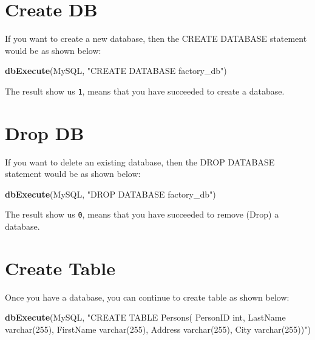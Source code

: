 \documentclass[
]{book}
\newenvironment{Shaded}{\begin{snugshade}}{\end{snugshade}}
\newcommand{\FunctionTok}[1]{\textcolor[rgb]{0.13,0.29,0.53}{\textbf{#1}}}
\newcommand{\NormalTok}[1]{#1}
\newcommand{\StringTok}[1]{\textcolor[rgb]{0.31,0.60,0.02}{#1}}
\begin{document}
\hypertarget{create-db}{%
\section{Create DB}\label{create-db}}

If you want to create a new database, then the CREATE DATABASE statement would be as shown below:

\begin{Shaded}
\begin{Highlighting}[]
\FunctionTok{dbExecute}\NormalTok{(MySQL, }\StringTok{"CREATE DATABASE factory\_db"}\NormalTok{)}
\end{Highlighting}
\end{Shaded}

The result show us \texttt{1}, means that you have succeeded to create a database.

\hypertarget{drop-db}{%
\section{Drop DB}\label{drop-db}}

If you want to delete an existing database, then the DROP DATABASE statement would be as shown below:

\begin{Shaded}
\begin{Highlighting}[]
\FunctionTok{dbExecute}\NormalTok{(MySQL, }\StringTok{"DROP DATABASE factory\_db"}\NormalTok{)}
\end{Highlighting}
\end{Shaded}

The result show us \texttt{0}, means that you have succeeded to remove (Drop) a database.

\hypertarget{create-table}{%
\section{Create Table}\label{create-table}}

Once you have a database, you can continue to create table as shown below:

\begin{Shaded}
\begin{Highlighting}[]
\FunctionTok{dbExecute}\NormalTok{(MySQL, }\StringTok{"CREATE TABLE Persons(}
\StringTok{                 PersonID int,}
\StringTok{                 LastName varchar(255),}
\StringTok{                 FirstName varchar(255),}
\StringTok{                 Address varchar(255),}
\StringTok{                 City varchar(255))"}\NormalTok{)}
\end{Highlighting}
\end{Shaded}
\end{document}
